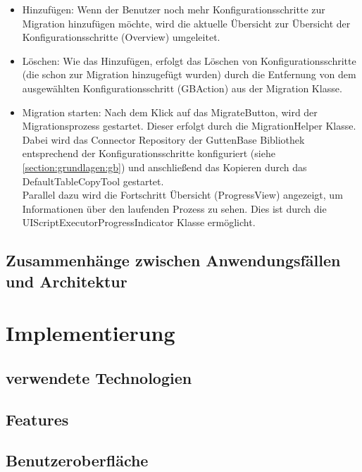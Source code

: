 \begin{itemize}
	\item Hinzufügen: Wenn der Benutzer noch mehr Konfigurationsschritte zur Migration hinzufügen möchte, wird die aktuelle Übersicht zur Übersicht der Konfigurationsschritte (Overview) umgeleitet.
	\item Löschen: Wie das Hinzufügen, erfolgt das Löschen von Konfigurationsschritte (die schon zur Migration hinzugefügt wurden) durch die Entfernung von dem ausgewählten Konfigurationsschritt (GBAction) aus der Migration Klasse. 
	\item Migration starten: Nach dem Klick auf das \glqq Migrate\grqq Button, wird der Migrationsprozess gestartet. Dieser erfolgt durch die MigrationHelper Klasse. Dabei wird das Connector Repository der GuttenBase Bibliothek entsprechend der Konfigurationsschritte konfiguriert (siehe \ref{section:grundlagen:gb}) und anschließend das Kopieren durch das DefaultTableCopyTool gestartet. \\
	Parallel dazu wird die Fortschritt Übersicht (ProgressView) angezeigt, um Informationen über den laufenden Prozess zu sehen. Dies ist durch die UIScriptExecutorProgressIndicator Klasse ermöglicht.
	
\end{itemize}

%
\subsection{Zusammenhänge zwischen Anwendungsfällen und Architektur}


\section{Implementierung}
\subsection{verwendete Technologien}




\subsection{Features}
\subsection{Benutzeroberfläche}


